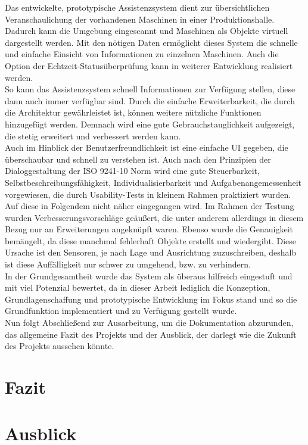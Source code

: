 Das entwickelte, prototypische Assistenzsystem dient zur übersichtlichen Veranschaulichung der vorhandenen Maschinen in einer Produktionshalle. Dadurch kann die 
Umgebung eingescannt und Maschinen als Objekte virtuell dargestellt werden. Mit den nötigen Daten ermöglicht dieses System die schnelle und einfache 
Einsicht von Informationen zu einzelnen Maschinen. Auch die Option der Echtzeit-Statusüberprüfung kann in weiterer Entwicklung realisiert werden. 
\\ 
So kann das Assistenzsystem schnell Informationen zur Verfügung stellen, diese dann auch immer verfügbar sind. Durch die einfache Erweiterbarkeit, die 
durch die Architektur gewährleistet ist, können weitere nützliche Funktionen hinzugefügt werden. Demnach wird eine gute Gebrauchstauglichkeit aufgezeigt, die 
stetig erweitert und verbessert werden kann.
\\ 
Auch im Hinblick der Benutzerfreundlichkeit ist eine einfache \acs{UI} gegeben, die überschaubar und schnell zu verstehen ist. Auch nach den Prinzipien der 
Dialoggestaltung der ISO 9241-10 Norm wird eine gute Steuerbarkeit, Selbstbeschreibungsfähigkeit, Individualisierbarkeit und Aufgabenangemessenheit vorgewiesen, 
die durch Usability-Tests in kleinem Rahmen praktiziert wurden. Auf diese in Folgendem nicht näher eingegangen wird. Im Rahmen der Testung wurden 
Verbesserungsvorschläge geäußert, die unter anderem allerdings in diesem Bezug nur an Erweiterungen angeknüpft waren. Ebenso wurde die Genauigkeit bemängelt, da 
diese manchmal fehlerhaft Objekte erstellt und wiedergibt. Diese Ursache ist den Sensoren, je nach Lage und Ausrichtung zuzuschreiben, deshalb ist diese 
Auffälligkeit nur schwer zu umgehend, bzw. zu verhindern. 
\\ 
In der Grundgesamtheit wurde das System als überaus hilfreich eingestuft und mit viel Potenzial bewertet, da in dieser Arbeit lediglich die Konzeption, 
Grundlagenschaffung und prototypische Entwicklung im Fokus stand und so die Grundfunktion implementiert und zu Verfügung gestellt wurde.
\\ 
\linebreak
Nun folgt Abschließend zur Ausarbeitung, um die Dokumentation abzurunden, das allgemeine Fazit des Projekts und der Ausblick, der darlegt wie die Zukunft des 
Projekts aussehen könnte. 

\chapter{Fazit}
\label{chap:Fazit}

\chapter{Ausblick}
\label{chap:Ausblick}